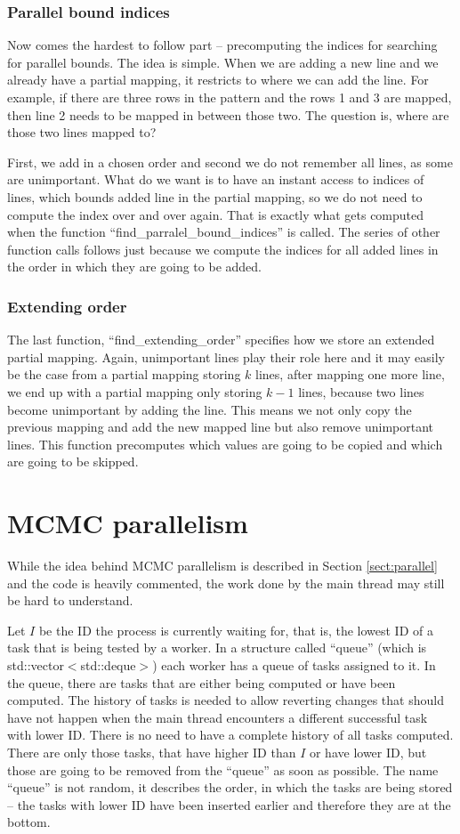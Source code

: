 \subsubsection{Parallel bound indices}
Now comes the hardest to follow part -- precomputing the indices for searching for parallel bounds. The idea is simple. When we are adding a new line and we already have a partial mapping, it restricts to where we can add the line. For example, if there are three rows in the pattern and the rows 1 and 3 are mapped, then line 2 needs to be mapped in between those two. The question is, where are those two lines mapped to?

First, we add in a chosen order and second we do not remember all lines, as some are unimportant. What do we want is to have an instant access to indices of lines, which bounds added line in the partial mapping, so we do not need to compute the index over and over again. That is exactly what gets computed when the function ``find\_parralel\_bound\_indices'' is called. The series of other function calls follows just because we compute the indices for all added lines in the order in which they are going to be added.

\subsubsection{Extending order}
The last function, ``find\_extending\_order'' specifies how we store an extended partial mapping. Again, unimportant lines play their role here and it may easily be the case from a partial mapping storing $k$ lines, after mapping one more line, we end up with a partial mapping only storing $k-1$ lines, because two lines become unimportant by adding the line. This means we not only copy the previous mapping and add the new mapped line but also remove unimportant lines. This function precomputes which values are going to be copied and which are going to be skipped.

\section{MCMC parallelism}
While the idea behind MCMC parallelism is described in Section \ref{sect:parallel} and the code is heavily commented, the work done by the main thread may still be hard to understand.

Let $I$ be the ID the process is currently waiting for, that is, the lowest ID of a task that is being tested by a worker. In a structure called ``queue'' (which is std::vector$<$std::deque$>$) each worker has a queue of tasks assigned to it. In the queue, there are tasks that are either being computed or have been computed. The history of tasks is needed to allow reverting changes that should have not happen when the main thread encounters a different successful task with lower ID. There is no need to have a complete history of all tasks computed. There are only those tasks, that have higher ID than $I$ or have lower ID, but those are going to be removed from the ``queue'' as soon as possible. The name ``queue'' is not random, it describes the order, in which the tasks are being stored -- the tasks with lower ID have been inserted earlier and therefore they are at the bottom.

